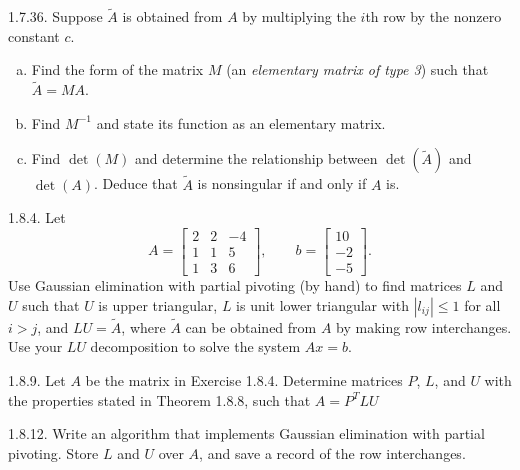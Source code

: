 \documentclass{report}
\begin{document}
    \bigbreak \noindent 
    \begin{mdframed}
        1.7.36. Suppose $\tilde{A}$ is obtained from $A$ by multiplying the $i$th row by the nonzero constant $c$.
        \begin{enumerate}[(a)]
            \item Find the form of the matrix $M$ (an \textit{elementary matrix of type 3}) 
                such that $\tilde{A} = M A$.

            \item Find $M^{-1}$ and state its function as an elementary matrix.

            \item Find $\det(M)$ and determine the relationship between $\det(\tilde{A})$ 
                and $\det(A)$. Deduce that $\tilde{A}$ is nonsingular if and only if $A$ is.
        \end{enumerate}
    \end{mdframed}

    \bigbreak \noindent 
    \begin{mdframed}
        1.8.4. Let 
        \[
            A = 
            \begin{bmatrix}
                2 & 2 & -4 \\
                1 & 1 & 5 \\
                1 & 3 & 6
            \end{bmatrix},
            \qquad
            b =
            \begin{bmatrix}
                10 \\
                -2 \\
                -5
            \end{bmatrix}.
        \]
        Use Gaussian elimination with partial pivoting (by hand) to find matrices $L$ and $U$ such that $U$ is upper triangular, $L$ is unit lower triangular with $|l_{ij}| \leq 1$ for all $i > j$, and $LU = \tilde{A}$, where $\tilde{A}$ can be obtained from $A$ by making row interchanges. Use your $LU$ decomposition to solve the system $Ax = b$.
    \end{mdframed}

    \bigbreak \noindent 
    \begin{mdframed}
        1.8.9. Let $A$ be the matrix in Exercise 1.8.4. Determine matrices $P$, $L$, and $U$ with the properties stated in Theorem 1.8.8, such that $A = P^{T}LU$
    \end{mdframed}

    \bigbreak \noindent 
    \begin{mdframed}
        1.8.12. Write an algorithm that implements Gaussian elimination with partial pivoting. Store $L$ and $U$ over $A$, and save a record of the row interchanges. 
    \end{mdframed}
\end{document}
